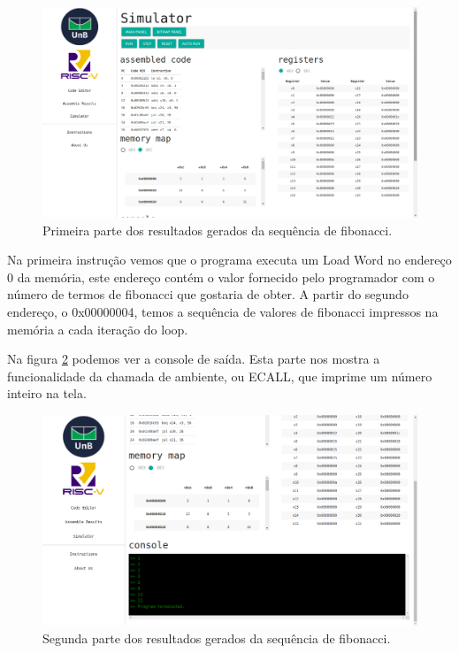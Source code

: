 	\begin{figure}[h]
	  \centering
	  \includegraphics[width=14cm]{img/fibonacci_results_1.png}
	  \caption{Primeira parte dos resultados gerados da sequência de fibonacci.}
	  \label{fig:fib-results-1}
	\end{figure}

	Na primeira instrução vemos que o programa executa um Load Word no endereço 0 da memória, este endereço contém o valor fornecido pelo programador com o número de termos de fibonacci que gostaria de obter. A partir do segundo endereço, o 0x00000004, temos a sequência de valores de fibonacci impressos na memória a cada iteração do loop.

	Na figura \ref{fig:fib-results-2} podemos ver a console de saída. Esta parte nos mostra a funcionalidade da chamada de ambiente, ou ECALL, que imprime um número inteiro na tela. 

	\begin{figure}[h]
	  \centering
	  \includegraphics[width=14cm]{img/fibonacci_results_2.png}
	  \caption{Segunda parte dos resultados gerados da sequência de fibonacci.}
	  \label{fig:fib-results-2}
	\end{figure}

